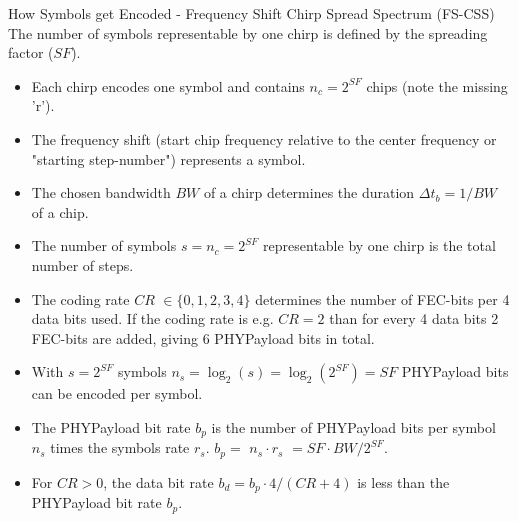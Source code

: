 \begin{frame}{How Symbols get Encoded - \alert{Frequency Shift} Chirp Spread Spectrum (FS-CSS)}
The \alert{number of symbols} representable by one chirp is defined by the \alert{spreading factor} ($SF$).
  \begin{itemize}
    \item \alert{Each chirp} encodes \alert{one symbol} and contains $n_c = 2^{SF}$ \alert{chips} (note the missing 'r').
    \item The \alert{frequency shift} (start chip frequency relative to the center frequency or "{}starting step-number"{}) represents a \alert{symbol}.
    \item The chosen \alert{bandwidth $BW$ of a chirp} determines the \alert{duration} $\Delta t_b = 1 / BW$ of a \alert{chip}.
    \item The \alert{number of symbols} $s = n_c = 2^{SF}$ \alert{representable by one} chirp is the \alert{total number of steps}.
    \item The \alert{coding rate $CR$} $\in \{0, 1, 2, 3, 4\}$ determines the number of \alert{FEC-bits} per \alert{4 data bits} used. If the coding rate is e.g. $CR = 2$ than for every \textcolor{fh-ooe-red}{4} \alert{data bits} \textcolor{fh-ooe-red}{2} \alert{FEC-bits} are added, giving \textcolor{fh-ooe-red}{6} \alert{PHYPayload bits} in total.
    \item With $s = 2^{SF}$ symbols \alert{$n_s = \log_2(s) = \log_2(2^{SF})= SF$ PHYPayload bits} can be encoded per \alert{symbol}.
    \item The \alert{PHYPayload bit rate} $b_p$ is the number of \alert{PHYPayload bits per symbol $n_s$} times the \alert{symbols rate $r_s$}. \textcolor{fh-ooe-red}{$b_p =$} $ n_s \cdot r_s$ \textcolor{fh-ooe-red}{$= SF \cdot BW / 2^{SF}$}.
    \item For $CR > 0$, the \alert{data bit rate} $b_d  = b_p \cdot 4 / (CR + 4)$ is less than the \alert{PHYPayload bit rate $b_p$}.
  \end{itemize}
\end{frame}
